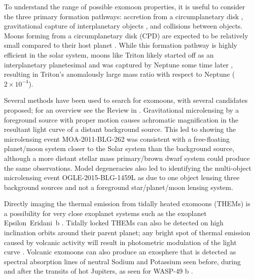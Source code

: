 \documentclass[fleqn,usenatbib]{mnras}
\begin{document}
To understand the range of possible exomoon properties, it is useful to consider the three primary formation pathways: accretion from a circumplanetary disk \citep{Kane13}, gravitational capture of interplanetary objects \citep[e.g. suggested for Triton by Neptune; ][]{Agnor06}, and collisions between objects.
%
Moons forming from a circumplanetary disk (CPD) are expected to be relatively small compared to their host planet \citep[masses less than $10^{-5}$ that of the planet;][]{Canup02}.
% 
While this formation pathway is highly efficient in the solar system, moons like Triton likely started off as an interplanetary planetesimal and was captured by Neptune some time later \citep{Agnor06}, resulting in Triton's anomalously large mass ratio with respect to Neptune ($2\times10^{-4}$). 
%

Several methods have been used to search for exomoons, with several candidates proposed; for an overview see the Review in \citet{2024arXiv240113293T}.
%
Gravitational microlensing by a foreground source with proper motion causes achromatic magnification in the resultant light curve of a distant background source.
%
This led to \citet{Bennett14} showing the microlensing event MOA-2011-BLG-262 was consistent with a free-floating planet/moon system closer to the Solar system than the background source, although a more distant stellar mass primary/brown dwarf system could produce the same observations.
%
Model degeneracies also led to \citet{Hwang18} identifying the multi-object microlensing event OGLE-2015-BLG-1459L as due to one object lensing three background sources and not a foreground star/planet/moon lensing system. 

Directly imaging the thermal emission from tidally heated exomoons (THEMs) is a possibility for very close exoplanet systems \citep{Peters13} such as the exoplanet Epsilon~Eridani~b \citep{Kleisioti23}.
%
Tidally locked THEMs can also be detected on high inclination orbits around their parent planet; any bright spot of thermal emission caused by volcanic activity will result in photometric modulation of the light curve \citep{Kleisioti24}.
%
Volcanic exomoons can also produce an exosphere that is detected as spectral absorption lines of neutral Sodium and Potassium seen before, during and after the transits of hot Jupiters, as seen for WASP-49 b \citep{Oza19}.
\end{document}
